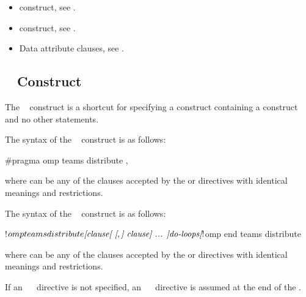 \crossreferences
\begin{itemize}
\item {} construct, see .

\item {} construct, see .

\item Data attribute clauses, see
.
\end{itemize}









\subsection{~ Construct}
\label{subsec:teams distribute Construct}
\summary
The ~ construct is a shortcut for specifying a  construct
containing a  construct and no other statements.

\syntax
\begin{ccppspecific}
The syntax of the ~ construct is as follows:

\begin{ompcPragma}
#pragma omp teams distribute \plc{[clause[ [},\plc{] clause] ... ] new-line}
\end{ompcPragma}

where  can be any of the clauses accepted by the  or 
directives with identical meanings and restrictions.
\end{ccppspecific}

\begin{fortranspecific}
The syntax of the ~ construct is as follows:

\begin{ompfPragma}
!$omp teams distribute \plc{[clause[ [},\plc{] clause] ... ]}
    \plc{do-loops}
\plc{[}!$omp end teams distribute\plc{]}
\end{ompfPragma}

where  can be any of the clauses accepted by the  or 
directives with identical meanings and restrictions.

If an ~~ directive is not specified, an
~~ directive is assumed at the end of the .
\end{fortranspecific}


